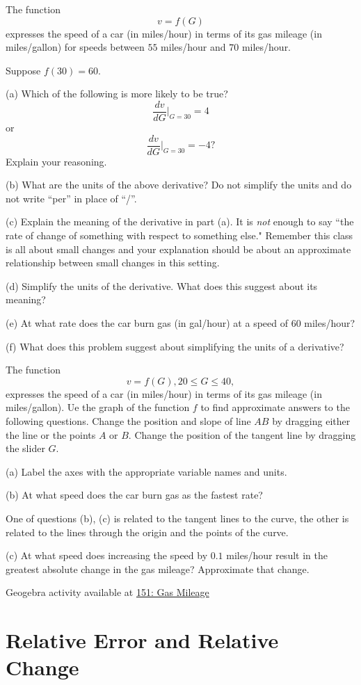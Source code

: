 \documentclass{ximera}
\begin{document}
\begin{question}  \label{Qdsfgbhn54}
The function 
\[
     v = f(G)
\]
expresses the speed of a car (in miles/hour) in terms of its gas mileage (in miles/gallon) for speeds between $55$ miles/hour and $70$ miles/hour. 

Suppose $f(30)=60$.

(a) Which of the following is more likely to be true?
\[
 \frac{dv}{dG}\Big|_{G=30} = 4 
\]
or
\[
   \frac{dv}{dG}\Big|_{G=30} = -4 ?
\]
Explain your reasoning.

(b) What are the units of the above derivative? Do not simplify the units and do not write ``per'' in place of ``/''.

(c) Explain the meaning of the derivative in part (a). It is \emph{not} enough to say ``the rate of change of something with respect to something else." Remember this class is all about small changes and your explanation should be about an approximate relationship between small changes in this setting.

(d) Simplify the units of the derivative. What does this suggest about its meaning?

(e) At what rate does the car burn gas (in gal/hour) at a speed of $60$ miles/hour?

(f) What does this problem suggest about simplifying the units of a derivative? 

\end{question}

\begin{question}  \label{Qdgfv4t5t}
The function 
\[
     v = f(G) , 20\leq G \leq 40,
\]
expresses the speed of a car (in miles/hour) in terms of its gas mileage (in miles/gallon). Ue the graph of the function $f$ to find approximate answers to the following questions. Change the position and slope of line $AB$ by dragging either the line or the points $A$ or $B$. Change the position of the tangent line by dragging the slider $G$.


(a) Label the axes with the appropriate variable names and units.

(b) At what speed does the car burn gas as the fastest rate?

\begin{hint}
One of questions (b), (c) is related to the tangent lines to the curve, the other is related to the lines through the origin and the points of the curve. 
\end{hint}

(c) At what speed does increasing the speed by $0.1$ miles/hour result in the greatest absolute change in the gas mileage? Approximate that change.

\begin{onlineOnly}
    \begin{center}
\end{center}
\end{onlineOnly}

Geogebra activity available at
\href{https://www.geogebra.org/classic/vjdf6x6z}{151: Gas Mileage}


\end{question}



\section*{Relative Error and Relative Change}
\end{document}
